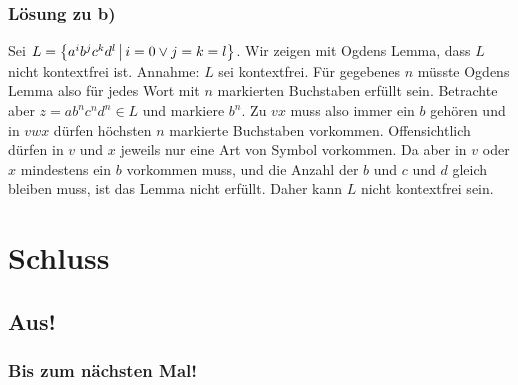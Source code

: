 \begin{frame}
\frametitle{Lösung zu b)}
Sei $L = \left\lbrace a^ib^jc^kd^l \,\middle\vert\, i = 0 \vee j = k = l \right\rbrace$. Wir zeigen mit Ogdens Lemma, dass $L$ nicht kontextfrei ist. \micropause
Annahme: $L$ sei kontextfrei. Für gegebenes $n$ müsste Ogdens Lemma also für jedes Wort mit $n$ markierten Buchstaben erfüllt sein. \micropause
Betrachte aber $z = ab^nc^nd^n \in L$ und markiere $b^n$. \micropause
Zu $vx$ muss also immer ein $b$ gehören und in $vwx$ dürfen höchsten $n$ markierte Buchstaben vorkommen. Offensichtlich dürfen in $v$ und $x$ jeweils nur eine Art von Symbol vorkommen. Da aber in $v$ oder $x$ mindestens ein $b$ vorkommen muss, und die Anzahl der $b$ und $c$ und $d$ gleich bleiben muss, ist das Lemma nicht erfüllt. Daher kann $L$ nicht kontextfrei sein.
\end{frame}

\section{Schluss}
\subsection{Aus!}
\begin{frame}
\frametitle{Bis zum nächsten Mal!}
\end{frame}


